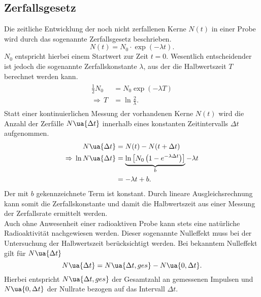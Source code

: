 \subsection{Zerfallsgesetz}
Die zeitliche Entwicklung der noch nicht zerfallenen Kerne $N(t)$ in einer Probe wird durch das sogenannte
Zerfallsgesetz beschrieben.
\begin{equation}
  N(t) = N_0 \cdot \exp\left(-\lambda t  \right).
  \label{eq: zerfallsgesetz}
\end{equation}
$N_0$ entspricht hierbei einem Startwert zur Zeit $t = 0$. Wesentlich entscheidender ist jedoch die sogenannte Zerfallskonstante $\lambda$,
aus der die Halbwertszeit $T$ berechnet werden kann.
\begin{align}
  \begin{aligned}
    \frac{1}{2} N_0 &= N_0 \exp\left(-\lambda T \right) \\
    \Rightarrow \, T &= \ln\frac{2}{\lambda}.
  \end{aligned}
  \label{eq: halbwertszeit}
\end{align}
Statt einer kontinuierlichen Messung der vorhandenen Kerne $N(t)$ wird die Anzahl der Zerfälle $N\ua{\Delta t}$ innerhalb eines
konstanten Zeitintervalls $\Delta t$ aufgenommen.
\begin{align}
  N\ua{\Delta t} &= N(t) - N(t + \Delta t) \\
  \Rightarrow \, \ln N\ua{\Delta t} &= \underbrace{\ln\left[N_0\left(1 - e^{-\lambda \Delta t} \right) \right]}_{b} - \lambda t\\
  &= -\lambda t + b.
\end{align}
Der mit $b$ gekennzeichnete Term ist konstant. Durch lineare Ausgleichsrechnung kann somit die Zerfallskonstante und damit die
Halbwertszeit aus einer Messung der Zerfallsrate ermittelt werden. \\
Auch ohne Anwesenheit einer radioaktiven Probe kann stets eine natürliche Radioaktivität nachgewiesen werden. Dieser sogenannte
Nulleffekt muss bei der Untersuchung der Halbwertszeit berücksichtigt werden.
Bei bekanntem Nulleffekt gilt für $N\ua{\Delta t}$
\begin{equation}
  N\ua{\Delta t} = N\ua{\Delta t, ges} - N\ua{0, \Delta t}.
  \label{eq: nullrate}
\end{equation}
Hierbei entspricht $N\ua{\Delta t, ges}$ der Gesamtzahl an gemessenen Impulsen und $N\ua{0, \Delta t}$ der Nullrate
bezogen auf das Intervall $\Delta t$.
